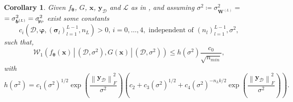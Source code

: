 \documentclass[a4paper, 11pt, reqno]{amsart}
\theoremstyle{plain}
\newtheorem{corollary}[theorem]{Corollary}
\theoremstyle{remark}
\theoremstyle{definition}
\newcommand{\given}{\, | \,}
\newcommand{\wass}[3][2]{\mathcal{W}_{#1}\left(#2, #3\right)}
\newcommand{\norm}[1]{\left\lVert#1\right\rVert}
\renewcommand{\exp}[1]{\operatorname{exp}\left(#1\right)}
\newcommand{\train}{\mathcal{D}}
\newcommand{\sigmay}{\sigma_{\scalebox{0.65}{$\kern-3pt\bm{y}_{\mathcal{D}}$}}}%
\begin{document}
\begin{corollary} \label{cor:convposteriorsigma}
	Given $f_{\bm{\theta}}$, $G$, $\bm{x}$, $\bm{y}_{\mathcal{D}}$ and $\mathcal{L}$ as in , and assuming $\sigma^2 \coloneqq \sigma_{\bm{W}^{(L)}}^2 =$ $= \sigma_{\bm{b}^{(L)}}^2 = \sigmay^2$ exist some constants
	\begin{equation*}
		c_i\left(\train, \bm{\varphi}, (\bm{\sigma}_l)_{l = 1}^{L - 1}, n_L\right) > 0, \,i = 0, \dots, 4, \text{ independent of } \left(n_l\right)_{l = 1}^{L - 1}, \sigma^2,
	\end{equation*}
	such that,
	\begin{equation*}
		\wass[1]{f_{\bm{\theta}}(\bm{x}) \given (\train, \sigma^2)}{G(\bm{x}) \given (\train, \sigma^2)} \leq h(\sigma^2) \frac{c_0}{\sqrt{n_{min}}},
	\end{equation*}
	with
	\begin{equation*}
		h(\sigma^2) = c_1 \left(\sigma^2\right)^{1/2} \exp{\frac{\norm{\bm{y}_{\mathcal{D}}}_F^2}{\sigma^2}} \left(c_2 + c_3 \left(\sigma^2\right)^{1/2} + c_4 \left(\sigma^2\right)^{- n_L k / 2} \exp{\frac{\norm{\bm{y}_{\mathcal{D}}}_F^2}{\sigma^2}}\right).
	\end{equation*}
\end{corollary}
\end{document}
